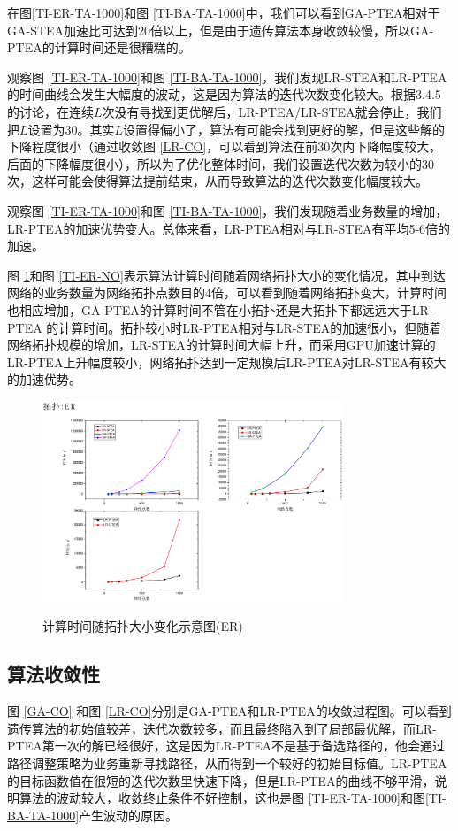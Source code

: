 在图\ref{TI-ER-TA-1000}和图 \ref{TI-BA-TA-1000}中，我们可以看到GA-PTEA相对于GA-STEA加速比可达到20倍以上，但是由于遗传算法本身收敛较慢，所以GA-PTEA的计算时间还是很糟糕的。

观察图 \ref{TI-ER-TA-1000}和图 \ref{TI-BA-TA-1000}，我们发现LR-STEA和LR-PTEA的时间曲线会发生大幅度的波动，这是因为算法的迭代次数变化较大。根据3.4.5的讨论，在连续$L$次没有寻找到更优解后，LR-PTEA/LR-STEA就会停止，我们把$L$设置为30。其实$L$设置得偏小了，算法有可能会找到更好的解，但是这些解的下降程度很小（通过收敛图 \ref{LR-CO}，可以看到算法在前30次内下降幅度较大，后面的下降幅度很小），所以为了优化整体时间，我们设置迭代次数为较小的30次，这样可能会使得算法提前结束，从而导致算法的迭代次数变化幅度较大。

观察图 \ref{TI-ER-TA-1000}和图 \ref{TI-BA-TA-1000}，我们发现随着业务数量的增加，LR-PTEA的加速优势变大。总体来看，LR-PTEA相对与LR-STEA有平均5-6倍的加速。


图 \ref{TI-BA-NO}和图 \ref{TI-ER-NO}表示算法计算时间随着网络拓扑大小的变化情况，其中到达网络的业务数量为网络拓扑点数目的4倍，可以看到随着网络拓扑变大，计算时间也相应增加，GA-PTEA的计算时间不管在小拓扑还是大拓扑下都远远大于LR-PTEA 的计算时间。拓扑较小时LR-PTEA相对与LR-STEA的加速很小，但随着网络拓扑规模的增加，LR-STEA的计算时间大幅上升，而采用GPU加速计算的LR-PTEA上升幅度较小，网络拓扑达到一定规模后LR-PTEA对LR-STEA有较大的加速优势。

\begin{figure}
\setlength{\abovecaptionskip}{-0.5cm}
\begin{center}
{\includegraphics[width=0.8\textwidth]{figures/TI-ER-NO.pdf}}
\end{center}
\caption{{\footnotesize{计算时间随拓扑大小变化示意图(ER)}}}
\label{TI-BA-NO}
\end{figure}
\subsection{算法收敛性}
图 \ref{GA-CO} 和图 \ref{LR-CO}分别是GA-PTEA和LR-PTEA的收敛过程图。可以看到遗传算法的初始值较差，迭代次数较多，而且最终陷入到了局部最优解，而LR-PTEA第一次的解已经很好，这是因为LR-PTEA不是基于备选路径的，他会通过路径调整策略为业务重新寻找路径，从而得到一个较好的初始目标值。LR-PTEA的目标函数值在很短的迭代次数里快速下降，但是LR-PTEA的曲线不够平滑，说明算法的波动较大，收敛终止条件不好控制，这也是图 \ref{TI-ER-TA-1000}和图\ref{TI-BA-TA-1000}产生波动的原因。

